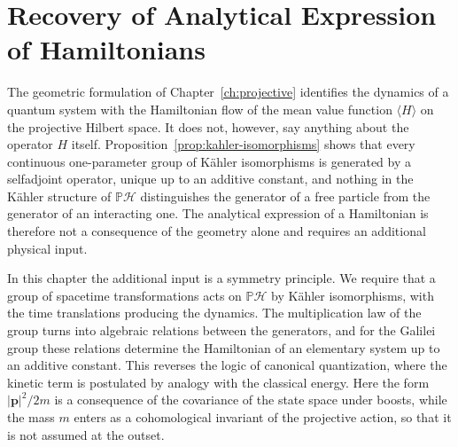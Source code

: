 
\setlength{\headwidth}{\textwidth}


\setcounter{chapter}{4}

\chapter{Recovery of Analytical Expression of Hamiltonians}
\label{ch:analytical-hamiltonians}

The geometric formulation of Chapter~\ref{ch:projective} identifies the dynamics of a quantum system with the Hamiltonian flow of the mean value function $\langle H\rangle$ on the projective Hilbert space. It does not, however, say anything about the operator $H$ itself. Proposition~\ref{prop:kahler-isomorphisms} shows that every continuous one-parameter group of Kähler isomorphisms is generated by a selfadjoint operator, unique up to an additive constant, and nothing in the Kähler structure of $\mathbb{P}\mathcal{H}$ distinguishes the generator of a free particle from the generator of an interacting one. The analytical expression of a Hamiltonian is therefore not a consequence of the geometry alone and requires an additional physical input.

In this chapter the additional input is a symmetry principle. We require that a group of spacetime transformations acts on $\mathbb{P}\mathcal{H}$ by Kähler isomorphisms, with the time translations producing the dynamics. The multiplication law of the group turns into algebraic relations between the generators, and for the Galilei group these relations determine the Hamiltonian of an elementary system up to an additive constant. This reverses the logic of canonical quantization, where the kinetic term is postulated by analogy with the classical energy. Here the form $|\mathbf{p}|^2/2m$ is a consequence of the covariance of the state space under boosts, while the mass $m$ enters as a cohomological invariant of the projective action, so that it is not assumed at the outset.

